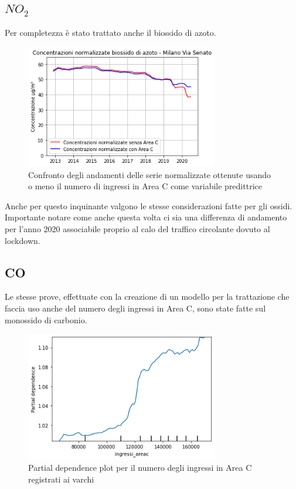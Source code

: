 \subsection{$NO_2$}
Per completezza è stato trattato anche il biossido di azoto.

\begin{figure}[h]
\centering
\includegraphics[width=0.75\textwidth]{no2_areac}
\caption{Confronto degli andamenti delle serie normalizzate ottenute usando o meno il numero di ingressi in Area C come variabile predittrice}
\label{fig:no2_areac}
\end{figure}

Anche per questo inquinante valgono le stesse considerazioni fatte per gli ossidi. Importante notare come anche questa volta ci sia una differenza di andamento per l'anno 2020 associabile proprio al calo del traffico circolante dovuto al lockdown.

\subsection{CO}
Le stesse prove, effettuate con la creazione di un modello per la trattazione che faccia uso anche del numero degli ingressi in Area C, sono state fatte sul monossido di carbonio.

\begin{figure}[h]
\centering
\includegraphics[width=0.75\textwidth]{co_part_dep}
\caption{Partial dependence plot per il numero degli ingressi in Area C registrati ai varchi}
\label{fig:co_part_dep}
\end{figure}

